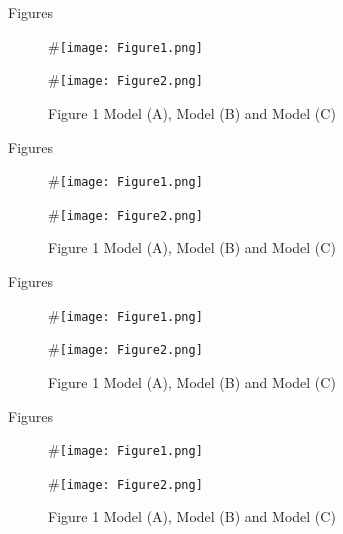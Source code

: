 \begin{frame}[t]
\begin{columns}[t]
\begin{column}{\onecolwid}
\begin{alertblock}{Figures}
\begin{figure}[H]
	\centering
	\begin{minipage}[b]{0.5\linewidth}
		#\texttt{[image: Figure1.png]}
	\end{minipage}\hfill
	\begin{minipage}[b]{0.5\linewidth}
		#\texttt{[image: Figure2.png]}
	\end{minipage}\hfill
	\caption{Figure 1 Model (A), Model (B) and Model (C)}
	\label{fig:Figure1}
\end{figure}
\end{alertblock}

\begin{alertblock}{Figures}
\begin{figure}[H]
	\centering
	\begin{minipage}[b]{0.5\linewidth}
		#\texttt{[image: Figure1.png]}
	\end{minipage}\hfill
	\begin{minipage}[b]{0.5\linewidth}
		#\texttt{[image: Figure2.png]}
	\end{minipage}\hfill
	\caption{Figure 1 Model (A), Model (B) and Model (C)}
	\label{fig:Figure1}
\end{figure}
\end{alertblock}

\begin{alertblock}{Figures}
\begin{figure}[H]
	\centering
	\begin{minipage}[b]{0.5\linewidth}
		#\texttt{[image: Figure1.png]}
	\end{minipage}\hfill
	\begin{minipage}[b]{0.5\linewidth}
		#\texttt{[image: Figure2.png]}
	\end{minipage}\hfill
	\caption{Figure 1 Model (A), Model (B) and Model (C)}
	\label{fig:Figure1}
\end{figure}
\end{alertblock}

\begin{alertblock}{Figures}
\begin{figure}[H]
	\centering
	\begin{minipage}[b]{0.5\linewidth}
		#\texttt{[image: Figure1.png]}
	\end{minipage}\hfill
	\begin{minipage}[b]{0.5\linewidth}
		#\texttt{[image: Figure2.png]}
	\end{minipage}\hfill
	\caption{Figure 1 Model (A), Model (B) and Model (C)}
	\label{fig:Figure1}
\end{figure}
\end{alertblock}


\end{column}
\end{columns}
\end{frame}
